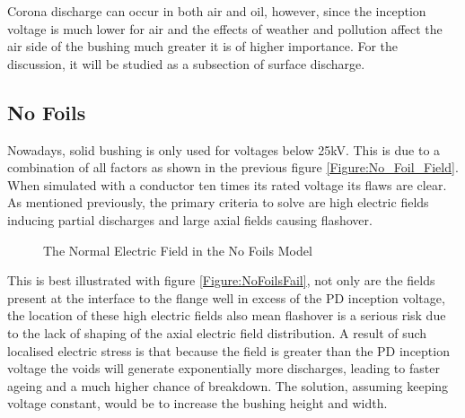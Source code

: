 Corona discharge can occur in both air and oil, however, since the inception voltage is much lower for air and the effects of weather and pollution affect the air side of the bushing much greater it is of higher importance. For the discussion, it will be studied as a subsection of surface discharge.  

\subsection{No Foils}
Nowadays, solid bushing is only used for voltages below 25kV. This is due to a combination of all factors as shown in the previous figure \ref{Figure:No_Foil_Field}. When simulated with a conductor ten times its rated voltage its flaws are clear. As mentioned previously, the primary criteria to solve are high electric fields inducing partial discharges and large axial fields causing flashover. 


\begin{figure}[!ht]
  \centering
{} 
\caption{The Normal Electric Field in the No Foils Model}
\label{Figure:Radial_No_Foils_Fails}
\end{figure}


This is best illustrated with figure \ref{Figure:NoFoilsFail}, not only are the fields present at the interface to the flange well in excess of the PD inception voltage, the location of these high electric fields also mean flashover is a serious risk due to the lack of shaping of the axial electric field distribution. A result of such localised electric stress is that because the field is greater than the PD inception voltage the voids will generate exponentially more discharges, leading to faster ageing and a much higher chance of breakdown. The solution, assuming keeping voltage constant, would be to increase the bushing height and width. 

